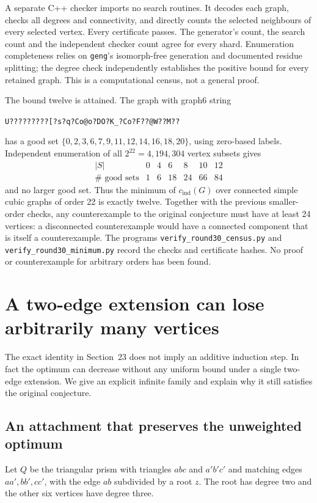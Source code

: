 \documentclass[11pt]{article}
\newcommand{\cind}{c_{\mathrm{ind}}}
\begin{document}
A separate C++ checker imports no search routines. It decodes each
graph, checks all degrees and connectivity, and directly counts the
selected neighbours of every selected vertex. Every certificate passes.
The generator's count, the search count and the independent checker
count agree for every shard. Enumeration completeness relies on
\texttt{geng}'s isomorph-free generation and documented residue splitting;
the degree check independently establishes the positive bound for every
retained graph. This is a computational census, not a general proof.

The bound twelve is attained. The graph with graph6 string
\begin{center}\texttt{U?????????[?s?q?Co@o?DO?K\_?Co?F??@W??M??}\end{center}
has a good set
$\{0,2,3,6,7,9,11,12,14,16,18,20\}$, using zero-based labels.
Independent enumeration of all $2^{22}=4,194,304$ vertex subsets gives
\[
\begin{array}{c|rrrrrr}
 |S|&0&4&6&8&10&12\\\hline
 \#\text{ good sets}&1&6&18&24&66&84
\end{array}
\]
and no larger good set. Thus the minimum of $\cind(G)$ over connected
simple cubic graphs of order 22 is exactly twelve. Together with the
previous smaller-order checks, any counterexample to the original
conjecture must have at least 24 vertices: a disconnected counterexample
would have a connected component that is itself a counterexample.
The programs \texttt{verify\_round30\_census.py} and
\texttt{verify\_round30\_minimum.py} record the checks and certificate
hashes. No proof or counterexample for arbitrary orders has been found.

\section{A two-edge extension can lose arbitrarily many vertices}
The exact identity in Section~23 does not imply an additive induction
step. In fact the optimum can decrease without any uniform bound under
a single two-edge extension. We give an explicit infinite family and
explain why it still satisfies the original conjecture.

\subsection{An attachment that preserves the unweighted optimum}
Let $Q$ be the triangular prism with triangles $abc$ and $a'b'c'$ and
matching edges $aa',bb',cc'$, with the edge $ab$ subdivided by a root $z$.
The root has degree two and the other six vertices have degree three.
\end{document}

